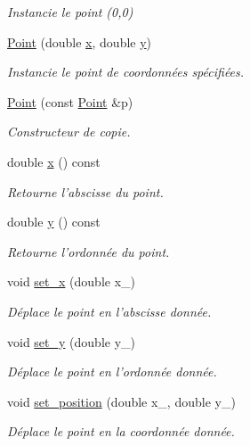 \begin{DoxyCompactItemize}
\begin{DoxyCompactList}\small\item\em Instancie le point (0,0) \end{DoxyCompactList}\item 
\hyperlink{classPoint_a78b55e8d5466bb8c2cf60fa55f2562ff}{Point} (double \hyperlink{classPoint_a3eef47b1c4849b3395a8f9c658ca7c4a}{x}, double \hyperlink{classPoint_a96e90df6b3c18e64c31abdf196e49ae9}{y})
\begin{DoxyCompactList}\small\item\em Instancie le point de coordonnées spécifiées. \end{DoxyCompactList}\item 
\hyperlink{classPoint_af0c0f20db1616447bc78184ed537ef6e}{Point} (const \hyperlink{classPoint}{Point} \&p)
\begin{DoxyCompactList}\small\item\em Constructeur de copie. \end{DoxyCompactList}\item 
double \hyperlink{classPoint_a3eef47b1c4849b3395a8f9c658ca7c4a}{x} () const 
\begin{DoxyCompactList}\small\item\em Retourne l'abscisse du point. \end{DoxyCompactList}\item 
double \hyperlink{classPoint_a96e90df6b3c18e64c31abdf196e49ae9}{y} () const 
\begin{DoxyCompactList}\small\item\em Retourne l'ordonnée du point. \end{DoxyCompactList}\item 
void \hyperlink{classPoint_a3fd167affdb9046f8f84b2b798bd97ff}{set\+\_\+x} (double x\+\_\+)
\begin{DoxyCompactList}\small\item\em Déplace le point en l'abscisse donnée. \end{DoxyCompactList}\item 
void \hyperlink{classPoint_a9b6f3a4149b55639374c94d88b96e11c}{set\+\_\+y} (double y\+\_\+)
\begin{DoxyCompactList}\small\item\em Déplace le point en l'ordonnée donnée. \end{DoxyCompactList}\item 
void \hyperlink{classPoint_a7fe67e4cd3ead676e59f4b9dba57c4fa}{set\+\_\+position} (double x\+\_\+, double y\+\_\+)
\begin{DoxyCompactList}\small\item\em Déplace le point en la coordonnée donnée. \end{DoxyCompactList}\item 

\end{DoxyCompactItemize}
